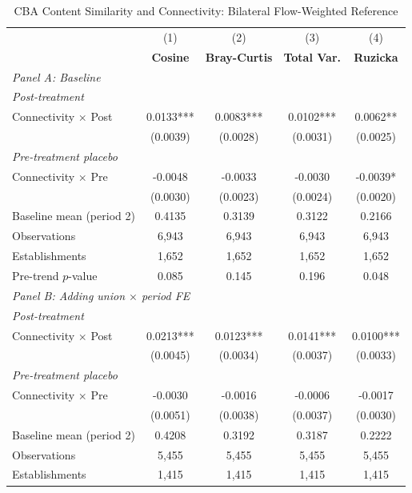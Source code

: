 \begin{table}[H]
\centering
\caption{CBA Content Similarity and Connectivity: Bilateral Flow-Weighted Reference}
\scriptsize
\setlength{\tabcolsep}{8pt}
\begin{tabular}{lcccc}
\hline\hline
 & (1) & (2) & (3) & (4) \\
 & \textbf{Cosine} & \textbf{Bray-Curtis} & \textbf{Total Var.} & \textbf{Ruzicka} \\
\hline
\multicolumn{5}{l}{\textit{Panel A: Baseline}} \\
\multicolumn{5}{l}{\textit{Post-treatment}} \\
Connectivity $\times$ Post & 0.0133*** & 0.0083*** & 0.0102*** & 0.0062** \\
 & (0.0039) & (0.0028) & (0.0031) & (0.0025) \\
\multicolumn{5}{l}{\textit{Pre-treatment placebo}} \\
Connectivity $\times$ Pre & -0.0048 & -0.0033 & -0.0030 & -0.0039* \\
 & (0.0030) & (0.0023) & (0.0024) & (0.0020) \\
\hline
Baseline mean (period 2) & 0.4135 & 0.3139 & 0.3122 & 0.2166 \\
Observations &        6,943 &        6,943 &        6,943 &        6,943 \\
Establishments &        1,652 &        1,652 &        1,652 &        1,652 \\
Pre-trend $p$-value & 0.085 & 0.145 & 0.196 & 0.048 \\
\hline
\multicolumn{5}{l}{\textit{Panel B: Adding union $\times$ period FE}} \\
\multicolumn{5}{l}{\textit{Post-treatment}} \\
Connectivity $\times$ Post & 0.0213*** & 0.0123*** & 0.0141*** & 0.0100*** \\
 & (0.0045) & (0.0034) & (0.0037) & (0.0033) \\
\multicolumn{5}{l}{\textit{Pre-treatment placebo}} \\
Connectivity $\times$ Pre & -0.0030 & -0.0016 & -0.0006 & -0.0017 \\
 & (0.0051) & (0.0038) & (0.0037) & (0.0030) \\
\hline
Baseline mean (period 2) & 0.4208 & 0.3192 & 0.3187 & 0.2222 \\
Observations &        5,455 &        5,455 &        5,455 &        5,455 \\
Establishments &        1,415 &        1,415 &        1,415 &        1,415 \\

\end{tabular}
\end{table}

